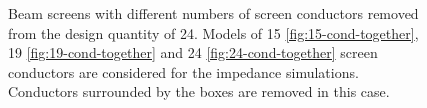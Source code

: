 \begin{figure}
\caption{Beam screens with different numbers of screen conductors removed from the design quantity of 24. Models of 15 \ref {fig:15-cond-together}, 19 \ref{fig:19-cond-together} and 24 \ref{fig:24-cond-together} screen conductors are considered for the impedance simulations. Conductors surrounded by the boxes are removed in this case.}
\label{fig:mki-take-away-cond-together}
\end{figure}

